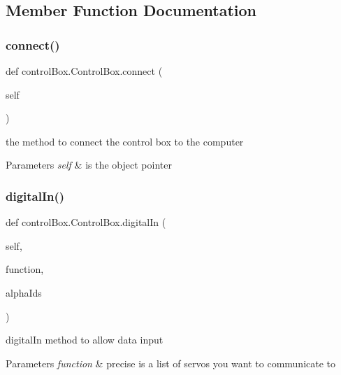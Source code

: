 \subsection{Member Function Documentation}
\mbox{\label{classcontrol_box_1_1_control_box_a9f886d2e945475796bc405a02ace59a5}} 
\subsubsection{\texorpdfstring{connect()}{connect()}}
{\footnotesize\ttfamily def control\+Box.\+Control\+Box.\+connect (\begin{DoxyParamCaption}\item[{}]{self }\end{DoxyParamCaption})}



the method to connect the control box to the computer 


\begin{DoxyParams}{Parameters}
{\em self} & is the object pointer \\
\hline
\end{DoxyParams}
\mbox{\label{classcontrol_box_1_1_control_box_a040ca20ecdfd112f21ef18771d722599}} 
\subsubsection{\texorpdfstring{digital\+In()}{digitalIn()}}
{\footnotesize\ttfamily def control\+Box.\+Control\+Box.\+digital\+In (\begin{DoxyParamCaption}\item[{}]{self,  }\item[{}]{function,  }\item[{}]{alpha\+Ids }\end{DoxyParamCaption})}



digital\+In method to allow data input 


\begin{DoxyParams}{Parameters}
{\em function} & precise  is a list of servos you want to communicate to \\
\hline
\end{DoxyParams}
\mbox{\label{classcontrol_box_1_1_control_box_ad2603c1dda6b71659b73f87626e98fc1}} 
